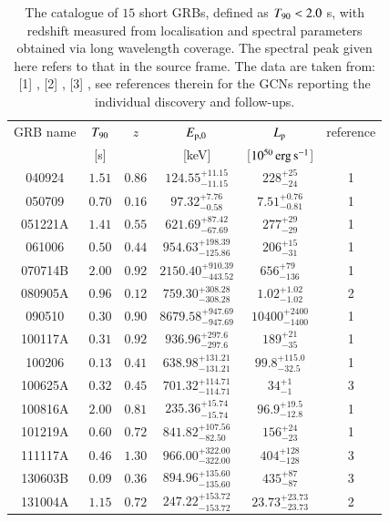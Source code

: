 \begin{table}
\caption[Catalogue of short GRBs with both redshift and spectral parameters]{The catalogue of $15$ short GRBs, defined as $T_{\rm{90}} < 2.0$ s, with redshift measured from localisation and spectral parameters obtained via long wavelength coverage. The spectral peak given here refers to that in the source frame. The data are taken from: [1] , [2] , [3] , see references therein for the GCNs reporting the individual discovery and follow-ups.}
\label{tab:short_catalogue}
\begin{center}
\begin{tabular}{|c|c|c|c|c|c|}
\hline
GRB name & $T_{\rm{90}}$ & $z$ & $E_{{\rm p,0}}$ & $L_{\rm p}$ & reference \\
 & [s] &  & [keV] & [$10^{50} \, \rm erg \, s^{-1}$] & \\
\hline
\hline
040924 & $1.51$ & $0.86$ & ${124.55}^{+11.15}_{-11.15}$ & $228^{+25}_{-24}$ & 1 \\
\hline
050709 & $0.70$ & $0.16$ & ${97.32}^{+7.76}_{-0.58}$ & $7.51^{+0.76}_{-0.81}$ & 1 \\
\hline
051221A & $1.41$ & $0.55$ & ${621.69}^{+87.42}_{-67.69}$ & $277^{+29}_{-29}$ & 1 \\
\hline
061006 & $0.50$ & $0.44$ & ${954.63}^{+198.39}_{-125.86}$ & $206^{+15}_{-31}$ & 1 \\
\hline
070714B & $2.00$ & $0.92$ & ${2150.40}^{+910.39}_{-443.52}$ & $656^{+79}_{-136}$ & 1 \\
\hline
080905A & $0.96$ & $0.12$ & ${759.30}^{+308.28}_{-308.28}$ & $1.02^{+1.02}_{-1.02}$ & 2 \\
\hline
090510 & $0.30$ & $0.90$ & ${8679.58}^{+947.69}_{-947.69}$ & $10400^{+2400}_{-1400}$ & 1 \\
\hline
100117A & $0.31$ & $0.92$ & ${936.96}^{+297.6}_{-297.6}$ & $189^{+21}_{-35}$ & 1 \\
\hline
100206 & $0.13$ & $0.41$ & ${638.98}^{+131.21}_{-131.21}$ & $99.8^{+115.0}_{-32.5}$ & 1 \\
\hline
100625A & $0.32$ & $0.45$ & ${701.32}^{+114.71}_{-114.71}$ & $34^{+1}_{-1}$ & 3 \\
\hline
100816A & $2.00$ & $0.81$ & ${235.36}^{+15.74}_{-15.74}$ & $96.9^{+19.5}_{-12.8}$ & 1 \\
\hline
101219A & $0.60$ & $0.72$ & ${841.82}^{+107.56}_{-82.50}$ & $156^{+24}_{-23}$ & 1 \\
\hline
111117A & $0.46$ & $1.30$ & ${966.00}^{+322.00}_{-322.00}$ & $404^{+128}_{-128}$ & 3 \\
\hline
130603B & $0.09$ & $0.36$ & ${894.96}^{+135.60}_{-135.60}$ & $435^{+87}_{-87}$ & 3 \\
\hline
131004A & $1.15$ & $0.72$ & ${247.22}^{+153.72}_{-153.72}$ & $23.73^{+23.73}_{-23.73}$ & 2 \\
\hline
\end{tabular}
\end{center}
\end{table}

